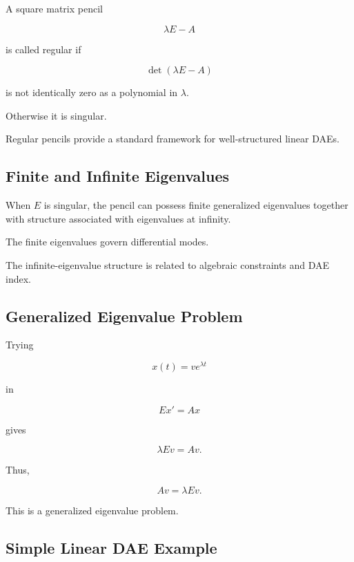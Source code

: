 A square matrix pencil

\[
\lambda E-A
\]

is called regular if

\[
\boxed{
\det(\lambda E-A)
}
\]

is not identically zero as a polynomial in \(\lambda\).

Otherwise it is singular.

Regular pencils provide a standard framework for well-structured linear
DAEs.

\subsection{Finite and Infinite Eigenvalues}
\label{subsec:finite-infinite-eigenvalues-dae}

When \(E\) is singular, the pencil can possess finite generalized
eigenvalues together with structure associated with eigenvalues at
infinity.

The finite eigenvalues govern differential modes.

The infinite-eigenvalue structure is related to algebraic constraints and
DAE index.

\subsection{Generalized Eigenvalue Problem}
\label{subsec:dae-generalized-eigenvalue-problem}

Trying

\[
x(t)=ve^{\lambda t}
\]

in

\[
E x'=Ax
\]

gives

\[
\lambda Ev=Av.
\]

Thus,

\[
\boxed{
Av
=
\lambda Ev.
}
\]

This is a generalized eigenvalue problem.

\subsection{Simple Linear DAE Example}
\label{subsec:simple-linear-dae-example}

